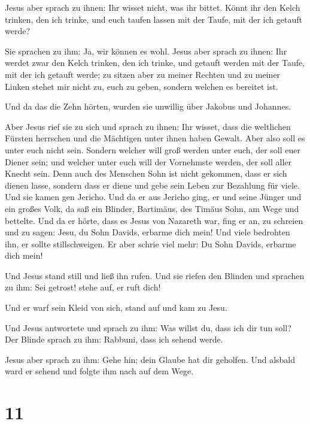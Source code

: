  Jesus aber sprach zu ihnen: Ihr wisset nicht, was ihr
bittet. Könnt ihr den Kelch trinken, den ich trinke, und euch taufen
lassen mit der Taufe, mit der ich getauft werde?

 Sie sprachen zu ihm: Ja, wir können es wohl. Jesus aber
sprach zu ihnen: Ihr werdet zwar den Kelch trinken, den ich trinke, und
getauft werden mit der Taufe, mit der ich getauft werde; 
zu sitzen aber zu meiner Rechten und zu meiner Linken stehet mir nicht
zu, euch zu geben, sondern welchen es bereitet ist.

 Und da das die Zehn hörten, wurden sie unwillig über
Jakobus und Johannes.

 Aber Jesus rief sie zu sich und sprach zu ihnen: Ihr
wisset, dass die weltlichen Fürsten herrschen und die Mächtigen unter
ihnen haben Gewalt.  Aber also soll es unter euch nicht
sein. Sondern welcher will groß werden unter euch, der soll euer Diener
sein;  und welcher unter euch will der Vornehmste werden,
der soll aller Knecht sein.  Denn auch des Menschen Sohn
ist nicht gekommen, dass er sich dienen lasse, sondern dass er diene und
gebe sein Leben zur Bezahlung für viele.  Und sie kamen
gen Jericho. Und da er aus Jericho ging, er und seine Jünger und ein
großes Volk, da saß ein Blinder, Bartimäus, des Timäus Sohn, am Wege und
bettelte.  Und da er hörte, dass es Jesus von Nazareth
war, fing er an, zu schreien und zu sagen: Jesu, du Sohn Davids, erbarme
dich mein!  Und viele bedrohten ihn, er sollte
stillschweigen. Er aber schrie viel mehr: Du Sohn Davids, erbarme dich
mein!

 Und Jesus stand still und ließ ihn rufen. Und sie riefen
den Blinden und sprachen zu ihm: Sei getrost! stehe auf, er ruft dich!

 Und er warf sein Kleid von sich, stand auf und kam zu
Jesu.

 Und Jesus antwortete und sprach zu ihm: Was willst du,
dass ich dir tun soll? Der Blinde sprach zu ihm: Rabbuni, dass ich
sehend werde.

 Jesus aber sprach zu ihm: Gehe hin; dein Glaube hat dir
geholfen. Und alsbald ward er sehend und folgte ihm nach auf dem Wege.

\hypertarget{section-10}{%
\section{11}\label{section-10}}

